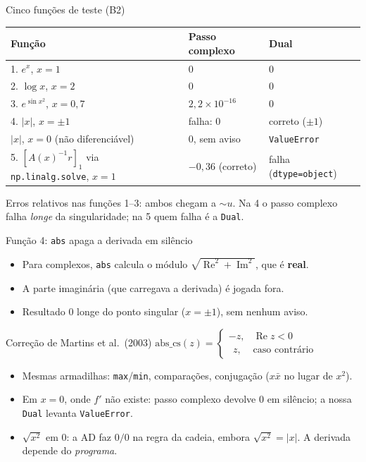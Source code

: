 \documentclass[aspectratio=169,11pt]{beamer}
\renewcommand{\Im}{\operatorname{Im}}
\renewcommand{\Re}{\operatorname{Re}}
\begin{document}
\begin{frame}{Cinco funções de teste (B2)}
  \centering\small
  \renewcommand{\arraystretch}{1.25}
  \begin{tabular}{L{6.0cm}L{3.4cm}L{3.4cm}}
    \toprule
    Função & Passo complexo & Dual \\
    . $e^x$, $x=1$ & $0$ & $0$ \\
    2. $\log x$, $x=2$ & $0$ & $0$ \\
    3. $e^{\sin x^2}$, $x=0{,}7$ & $2{,}2\times10^{-16}$ & $0$ \\
    4. $|x|$, $x=\pm1$ & \textcolor{laranja}{falha}: $0$ & correto ($\pm1$) \\
    \phantom{4.} $|x|$, $x=0$ (não diferenciável) & $0$, sem aviso & \texttt{ValueError} \\
    5. $[A(x)^{-1}r]_1$ via \texttt{np.linalg.solve}, $x=1$ & $-0{,}36$ (correto) & \textcolor{laranja}{falha} (\texttt{dtype=object}) \\
    \bottomrule
  \end{tabular}
  \vspace{0.6em}

  \raggedright
  Erros relativos nas funções 1--3: ambos chegam a $\sim u$. Na 4 o passo complexo falha \emph{longe} da singularidade; na 5 quem falha é a \texttt{Dual}.
\end{frame}

\begin{frame}{Função 4: \texttt{abs} apaga a derivada em silêncio}
  \begin{itemize}
    \item Para complexos, \texttt{abs} calcula o módulo $\sqrt{\Re^2+\Im^2}$, que é \textbf{real}.
    \item A parte imaginária (que carregava a derivada) é jogada fora.
    \item Resultado $0$ \alert{longe} do ponto singular ($x=\pm1$), sem nenhum aviso.
  \end{itemize}
  \begin{block}{Correção de Martins et al.\ (2003)}
    \centering $\mathrm{abs\_cs}(z) = \begin{cases}-z, & \Re z<0\\ \ \ z, & \text{caso contrário}\end{cases}$
  \end{block}
  \begin{itemize}
    \item Mesmas armadilhas: \texttt{max}/\texttt{min}, comparações, conjugação ($x\bar x$ no lugar de $x^2$).
    \item Em $x=0$, onde $f'$ não existe: passo complexo devolve $0$ em silêncio; a nossa \texttt{Dual} levanta \texttt{ValueError}.
    \item $\sqrt{x^2}$ em $0$: a AD faz $0/0$ na regra da cadeia, embora $\sqrt{x^2}=|x|$. A derivada depende do \emph{programa}.
  \end{itemize}
\end{frame}
\end{document}
